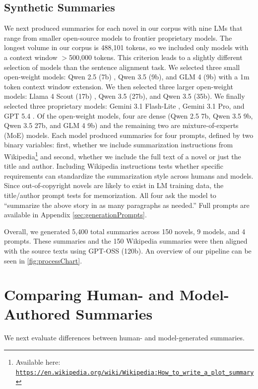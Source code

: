 \documentclass{article} %
\begin{document}
\subsection{Synthetic Summaries}
We next produced summaries for each novel in our corpus with nine LMs that range from smaller open-source models to frontier proprietary models.
The longest volume in our corpus is 488,101 tokens, so we included only models with a context window $>$500,000 tokens.
This criterion leads to a slightly different selection of models than the sentence alignment task.
We selected three small open-weight models: Qwen 2.5 (7b) \citep{qwen2025qwen25technicalreport}, Qwen 3.5 (9b), and GLM 4 (9b) \citep{glm2024chatglmfamilylargelanguage} with a 1m token context window extension.
We then selected three larger open-weight models: Llama 4 Scout (17b) \citep{MetaAI2025Llama4}, Qwen 3.5 (27b), and Qwen 3.5 (35b).
We finally selected three proprietary models: Gemini 3.1 Flash-Lite \citep{GeminiTeam2026Gemini31Pro}, Gemini 3.1 Pro, and GPT 5.4 \citep{OpenAI2025GPT5}.
Of the open-weight models, four are dense (Qwen 2.5 7b, Qwen 3.5 9b, Qwen 3.5 27b, and GLM 4 9b) and the remaining two are mixture-of-experts (MoE) models.
Each model produced summaries for four prompts, defined by two binary variables:
first, whether we include summarization instructions from Wikipedia\footnote{Available here: \href{https://en.wikipedia.org/wiki/Wikipedia:How_to_write_a_plot_summary}{\texttt{https://en.wikipedia.org/wiki/Wikipedia:How\_to\_write\_a\_plot\_summary}}} and second, whether we include the full text of a novel or just the title and author. Including Wikipedia instructions tests whether specific requirements can standardize the summarization style across humans and models.
Since out-of-copyright novels are likely to exist in LM training data, the title/author prompt tests for memorization. 
All four ask the model to ``summarize the above story in as many paragraphs as needed.''
Full prompts are available in Appendix \ref{sec:generationPrompts}.

Overall, we generated 5,400 total summaries across 150 novels, 9 models, and 4 prompts. These summaries and the 150 Wikipedia summaries were then aligned with the source texts using GPT-OSS (120b). An overview of our pipeline can be seen in \cref{fig:processChart}.

\section{Comparing Human- and Model-Authored Summaries}
We next evaluate differences between human- and model-generated summaries.
\end{document}
